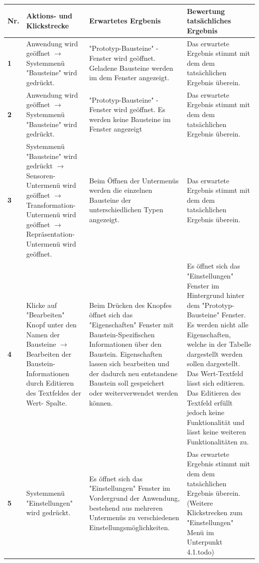 \documentclass[parskip=full]{scrartcl}
\begin{document}
\begin{table}[h]
\begin{tabular}{| p{} | p{} | p{} | p{} |}
	\hline
	\textbf{Nr.} & \textbf{Aktions- und Klickstrecke} & \textbf{Erwartetes Ergbenis}  & \textbf{ Bewertung tatsächliches Ergebnis} \\ \hline
	\textbf{1}
	& 
	Anwendung wird geöffnet $\rightarrow$ Systemmenü "Bausteine" wird gedrückt.
	&
	"Prototyp-Bausteine" - Fenster wird geöffnet. Geladene Bausteine werden im dem Fenster angezeigt.
	& 
	Das erwartete Ergebnis stimmt mit dem dem tatsächlichen Ergebnis überein.
	\\ \hline
	
	\textbf{2}
	& 
	Anwendung wird geöffnet $\rightarrow$ Systemmenü "Bausteine" wird gedrückt.
	&
	"Prototyp-Bausteine" - Fenster wird geöffnet. Es werden keine Bausteine im Fenster angezeigt
	& 
	Das erwartete Ergebnis stimmt mit dem dem tatsächlichen Ergebnis überein.
	\\ \hline
	
	\textbf{3}
	& 
	Systemmenü "Bausteine" wird gedrückt $\rightarrow$ Sensoren-Untermenü wird geöffnet $\rightarrow$ Transformation-Untermenü wird geöffnet $\rightarrow$ Repräsentation-Untermenü wird geöffnet.
	&
	Beim Öffnen der Untermenüs werden die einzelnen Bausteine der unterschiedlichen Typen angezeigt.
	& 
	Das erwartete Ergebnis stimmt mit dem dem tatsächlichen Ergebnis überein.
	\\ \hline



	\textbf{4}
	& 
	Klicke auf "Bearbeiten" Knopf unter den Namen der Bausteine $\rightarrow$ Bearbeiten der Baustein-Informationen durch 
	Editieren des Textfeldes der Wert- Spalte.
	&
	Beim Drücken des Knopfes öffnet sich das "Eigenschaften" Fenster mit Baustein-Spezifischen Informationen über den 				Baustein. Eigenschaften lassen sich bearbeiten und der dadurch neu entstandene Baustein soll gespeichert oder weiterverwendet werden können.
	& 
	Es öffnet sich das "Einstellungen" Fenster im Hintergrund hinter dem "Prototyp-Bausteine" Fenster. Es werden nicht alle 			Eigenschaften, welche in der Tabelle dargestellt werden sollen dargestellt. Das Wert-Textfeld lässt sich editieren. Das				Editieren des Textfeld erfüllt jedoch keine Funktionalität und lässt keine weiteren Funktionalitäten zu.
	\\ \hline
	
	\textbf{5}
	& 
	Systemmenü "Einstellungen" wird gedrückt.
	&
	Es öffnet sich das "Einstellungen" Fenster im Vordergrund der Anwendung, bestehend aus mehreren Untermenüs zu 				verschiedenen Einstellungsmöglichkeiten.
	& 
	Das erwartete Ergebnis stimmt mit dem dem tatsächlichen Ergebnis überein.
	(Weitere Klickstrecken zum "Einstellungen" Menü im Unterpunkt 4.1.todo)
	\\ \hline



\end{tabular}
\end{table}
\end{document}
